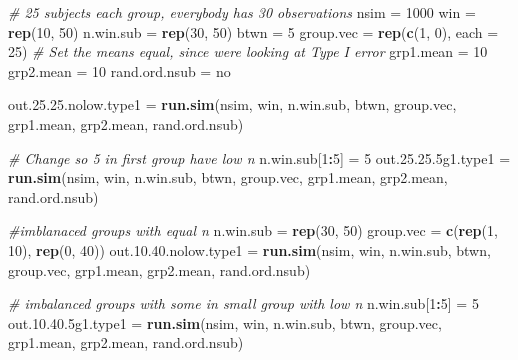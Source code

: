 \documentclass[
]{book}
\newenvironment{Shaded}{\begin{snugshade}}{\end{snugshade}}
\newcommand{\CommentTok}[1]{\textcolor[rgb]{0.56,0.35,0.01}{\textit{#1}}}
\newcommand{\DataTypeTok}[1]{\textcolor[rgb]{0.13,0.29,0.53}{#1}}
\newcommand{\DecValTok}[1]{\textcolor[rgb]{0.00,0.00,0.81}{#1}}
\newcommand{\FloatTok}[1]{\textcolor[rgb]{0.00,0.00,0.81}{#1}}
\newcommand{\KeywordTok}[1]{\textcolor[rgb]{0.13,0.29,0.53}{\textbf{#1}}}
\newcommand{\NormalTok}[1]{#1}
\newcommand{\OperatorTok}[1]{\textcolor[rgb]{0.81,0.36,0.00}{\textbf{#1}}}
\newcommand{\StringTok}[1]{\textcolor[rgb]{0.31,0.60,0.02}{#1}}
\begin{document}
\begin{Shaded}
\begin{Highlighting}[]
\CommentTok{\# 25 subjects each group, everybody has 30 observations}
\NormalTok{nsim =}\StringTok{ }\DecValTok{1000}
\NormalTok{win =}\StringTok{ }\KeywordTok{rep}\NormalTok{(}\DecValTok{10}\NormalTok{, }\DecValTok{50}\NormalTok{)}
\NormalTok{n.win.sub =}\StringTok{ }\KeywordTok{rep}\NormalTok{(}\DecValTok{30}\NormalTok{, }\DecValTok{50}\NormalTok{)}
\NormalTok{btwn =}\StringTok{ }\DecValTok{5}
\NormalTok{group.vec =}\StringTok{ }\KeywordTok{rep}\NormalTok{(}\KeywordTok{c}\NormalTok{(}\DecValTok{1}\NormalTok{, }\DecValTok{0}\NormalTok{), }\DataTypeTok{each =} \DecValTok{25}\NormalTok{)}
\CommentTok{\# Set the means equal, since we\textquotesingle{}re looking at Type I error}
\NormalTok{grp1.mean =}\StringTok{ }\DecValTok{10}
\NormalTok{grp2.mean =}\StringTok{ }\DecValTok{10}
\NormalTok{rand.ord.nsub =}\StringTok{ \textquotesingle{}no\textquotesingle{}}

\NormalTok{out.}\DecValTok{25}\NormalTok{.}\FloatTok{25.}\NormalTok{nolow.type1 =}\StringTok{ }\KeywordTok{run.sim}\NormalTok{(nsim, win, n.win.sub, btwn,}
\NormalTok{                          group.vec, grp1.mean, }
\NormalTok{                          grp2.mean, rand.ord.nsub)}

\CommentTok{\# Change so 5 in first group have low n}
\NormalTok{n.win.sub[}\DecValTok{1}\OperatorTok{:}\DecValTok{5}\NormalTok{] =}\StringTok{ }\DecValTok{5}
\NormalTok{out.}\DecValTok{25}\NormalTok{.}\FloatTok{25.5}\NormalTok{g1.type1 =}\StringTok{ }\KeywordTok{run.sim}\NormalTok{(nsim, win, n.win.sub, btwn,}
\NormalTok{                        group.vec, grp1.mean, }
\NormalTok{                        grp2.mean, rand.ord.nsub)}

\CommentTok{\#imblanaced groups with equal n}
\NormalTok{n.win.sub =}\StringTok{ }\KeywordTok{rep}\NormalTok{(}\DecValTok{30}\NormalTok{, }\DecValTok{50}\NormalTok{)}
\NormalTok{group.vec =}\StringTok{ }\KeywordTok{c}\NormalTok{(}\KeywordTok{rep}\NormalTok{(}\DecValTok{1}\NormalTok{, }\DecValTok{10}\NormalTok{), }\KeywordTok{rep}\NormalTok{(}\DecValTok{0}\NormalTok{, }\DecValTok{40}\NormalTok{))}
\NormalTok{out.}\DecValTok{10}\NormalTok{.}\FloatTok{40.}\NormalTok{nolow.type1 =}\StringTok{ }\KeywordTok{run.sim}\NormalTok{(nsim, win, n.win.sub, btwn,}
\NormalTok{                          group.vec, grp1.mean, grp2.mean,}
\NormalTok{                          rand.ord.nsub)}

\CommentTok{\# imbalanced groups with some in small group with low n}
\NormalTok{n.win.sub[}\DecValTok{1}\OperatorTok{:}\DecValTok{5}\NormalTok{] =}\StringTok{ }\DecValTok{5}
\NormalTok{out.}\DecValTok{10}\NormalTok{.}\FloatTok{40.5}\NormalTok{g1.type1 =}\StringTok{ }\KeywordTok{run.sim}\NormalTok{(nsim, win, n.win.sub, btwn, }
\NormalTok{                        group.vec, grp1.mean, grp2.mean,}
\NormalTok{                        rand.ord.nsub)}
\end{Highlighting}
\end{Shaded}
\end{document}
